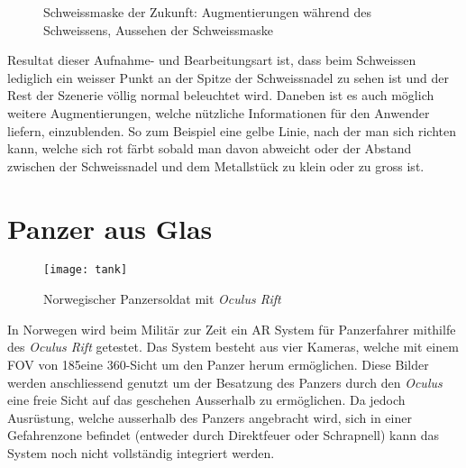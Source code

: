 \vspace{-30pt}
\begin{figure}[h]%
	\centering
	\hspace{8pt}%
	\caption[Schweissmaske der Zukunft]
	{Schweissmaske der Zukunft:
	 Augmentierungen während des Schweissens,
	 Aussehen der Schweissmaske}%
	\label{fig:weld}%
\end{figure}
\vspace{-15pt}
Resultat dieser Aufnahme- und Bearbeitungsart ist, dass beim Schweissen lediglich ein weisser Punkt an der Spitze der Schweissnadel zu sehen ist und der Rest der Szenerie völlig normal beleuchtet wird. Daneben ist es auch möglich weitere Augmentierungen, welche nützliche Informationen für den Anwender liefern, einzublenden. So zum Beispiel eine gelbe Linie, nach der man sich richten kann, welche sich rot färbt sobald man davon abweicht oder der Abstand zwischen der Schweissnadel und dem Metallstück zu klein oder zu gross ist.\cite{website:welding}

\newpage
\section{Panzer aus Glas}\label{s.tank}
\begin{wrapfigure}{r}{0.5\textwidth}
	\vspace{-25pt}
	\begin{center}
		\texttt{[image: tank]}
	\end{center}
	\vspace{-15pt}
	\captionsetup{width=0.42\textwidth}
	\caption{Norwegischer Panzersoldat mit \textit{Oculus Rift}}\label{tank}
	\vspace{-10pt}
\end{wrapfigure}
In Norwegen wird beim Militär zur Zeit ein AR System für Panzerfahrer mithilfe des \textit{Oculus Rift} getestet. Das System besteht aus vier Kameras, welche mit einem FOV von 185\textdegree eine 360\textdegree-Sicht um den Panzer herum ermöglichen. Diese Bilder werden anschliessend genutzt um der Besatzung des Panzers durch den \textit{Oculus} eine freie Sicht auf das geschehen Ausserhalb zu ermöglichen. Da jedoch Ausrüstung, welche ausserhalb des Panzers angebracht wird, sich in einer Gefahrenzone befindet (entweder durch Direktfeuer oder Schrapnell) kann das System noch nicht vollständig integriert werden.\cite{website:tank}

